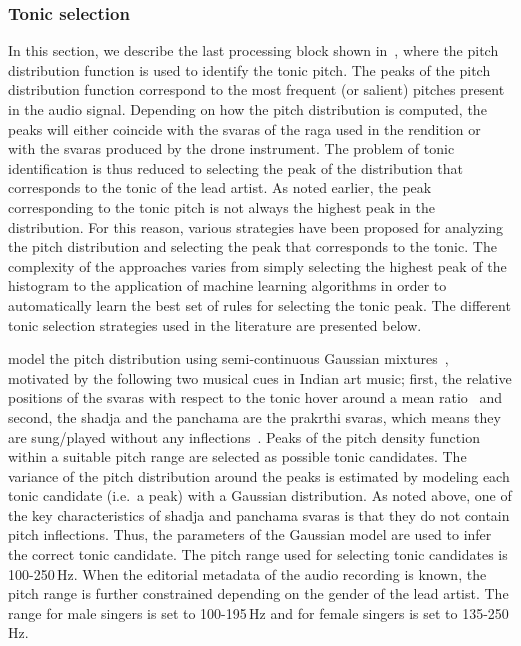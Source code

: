 \subsubsection{Tonic selection}
\label{sec:tonic_selection}

In this section, we describe the last processing block shown in~, where the pitch distribution function is used to identify the tonic pitch. The peaks of the pitch distribution function correspond to the most frequent (or salient) pitches present in the audio signal. Depending on how the pitch distribution is computed, the peaks will either coincide with the \glspl{svara} of the \gls{raga} used in the rendition or with the \glspl{svara} produced by the drone instrument. The problem of tonic identification is thus reduced to selecting the peak of the distribution that corresponds to the tonic of the lead artist. As noted earlier, the peak corresponding to the tonic pitch is not always the highest peak in the distribution. For this reason, various strategies have been proposed for analyzing the pitch distribution and selecting the peak that corresponds to the tonic. The complexity of the approaches varies from simply selecting the highest peak of the histogram to the application of machine learning algorithms in order to automatically learn the best set of rules for selecting the tonic peak. The different tonic selection strategies used in the literature are presented below.

\cite{ranjani2011carnatic} model the pitch distribution using semi-continuous Gaussian mixtures~\citep{Huang2001}, motivated by the following two musical cues in Indian art music; first, the relative positions of the \glspl{svara} with respect to the tonic hover around a mean ratio~\citep{Krishnaswamy2003} and second, the \gls{shadja} and the \gls{panchama} are the prakrthi \glspl{svara}, which means they are sung/played without any inflections~\citep{Manikandan2004,Krishnaswamyicassp2003}. Peaks of the pitch density function within a suitable pitch range are selected as possible tonic candidates. The variance of the pitch distribution around the peaks is estimated by modeling each tonic candidate (i.e.~a peak) with a Gaussian distribution. As noted above, one of the key characteristics of \gls{shadja} and \gls{panchama} \glspl{svara} is that they do not contain pitch inflections. Thus, the parameters of the Gaussian model are used to infer the correct tonic candidate. The pitch range used for selecting tonic candidates is 100-250\,Hz. When the editorial metadata of the audio recording is known, the pitch range is further constrained depending on the gender of the lead artist. The range for male singers is set to 100-195\,Hz and for female singers is set to 135-250\,Hz.

